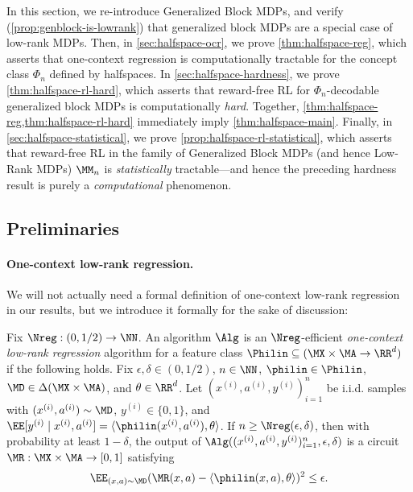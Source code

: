 
In this section, we re-introduce Generalized Block MDPs, and verify (\cref{prop:genblock-is-lowrank}) that generalized block MDPs are a special case of low-rank MDPs. Then, in \cref{sec:halfspace-ocr}, we prove \cref{thm:halfspace-reg}, which asserts that one-context regression is computationally tractable for the concept class $\Phi_n$ defined by halfspaces. In \cref{sec:halfspace-hardness}, we prove \cref{thm:halfspace-rl-hard}, which asserts that reward-free RL for $\Phi_n$-decodable generalized block MDPs is computationally \emph{hard}. Together, \cref{thm:halfspace-reg,thm:halfspace-rl-hard} immediately imply \cref{thm:halfspace-main}. Finally, in \cref{sec:halfspace-statistical}, we prove \cref{prop:halfspace-rl-statistical}, which asserts that reward-free RL in the family of Generalized Block MDPs (and hence Low-Rank MDPs) $\MM_n$ is \emph{statistically} tractable---and hence the preceding hardness result is purely a \emph{computational} phenomenon.

\subsection{Preliminaries}\label{sec:low-rank-prelim}

\paragraph{One-context low-rank regression.} We will not actually need a formal definition of one-context low-rank regression in our results, but we introduce it formally for the sake of discussion:

\begin{definition}\label{def:low-rank-reg-app}
Fix $\Nreg: (0,1/2) \to \NN$. An algorithm $\Alg$ is an $\Nreg$-efficient \emph{one-context low-rank regression} algorithm for a feature class $\Philin \subseteq (\MX \times \MA \to \RR^d)$ if the following holds. Fix $\epsilon,\delta \in (0,1/2)$, $n \in \NN$, $\philin\in\Philin$, $\MD\in\Delta(\MX\times\MA)$, and $\theta \in \RR^d$. Let $(x^{(i)},a^{(i)},y^{(i)})_{i=1}^n$ be i.i.d. samples with $(x^{(i)},a^{(i)})\sim\MD$, $y^{(i)} \in \{0,1\}$, and $\EE[y^{(i)}\mid{}x^{(i)},a^{(i)}] = \langle \philin(x^{(i)},a^{(i)}),\theta\rangle$. If $n \geq \Nreg(\epsilon,\delta)$, then with probability at least $1-\delta$, the output of $\Alg((x^{(i)},a^{(i)},y^{(i)})_{i=1}^n,\epsilon,\delta)$ is a circuit $\MR: \MX\times\MA\to[0,1]$ satisfying \[\EE_{(x,a)\sim\MD} (\MR(x,a) - \langle \philin(x,a),\theta\rangle)^2 \leq \epsilon.\]
\end{definition}

